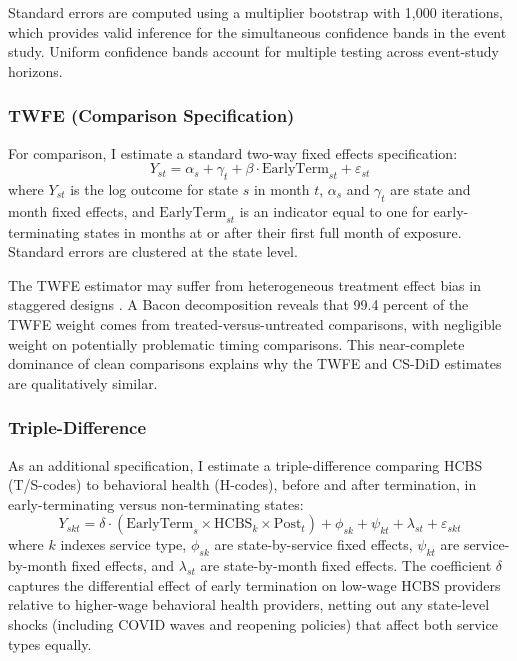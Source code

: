 \documentclass[12pt]{article}
\begin{document}
Standard errors are computed using a multiplier bootstrap with 1,000 iterations, which provides valid inference for the simultaneous confidence bands in the event study. Uniform confidence bands account for multiple testing across event-study horizons.

\subsubsection{TWFE (Comparison Specification)}

For comparison, I estimate a standard two-way fixed effects specification:
\begin{equation}
Y_{st} = \alpha_s + \gamma_t + \beta \cdot \text{EarlyTerm}_{st} + \varepsilon_{st}
\end{equation}
where $Y_{st}$ is the log outcome for state $s$ in month $t$, $\alpha_s$ and $\gamma_t$ are state and month fixed effects, and $\text{EarlyTerm}_{st}$ is an indicator equal to one for early-terminating states in months at or after their first full month of exposure. Standard errors are clustered at the state level.

The TWFE estimator may suffer from heterogeneous treatment effect bias in staggered designs \citep{goodman-bacon2021, dechaisemartin2020, sun2021}. A Bacon decomposition reveals that 99.4 percent of the TWFE weight comes from treated-versus-untreated comparisons, with negligible weight on potentially problematic timing comparisons. This near-complete dominance of clean comparisons explains why the TWFE and CS-DiD estimates are qualitatively similar.

\subsubsection{Triple-Difference}

As an additional specification, I estimate a triple-difference comparing HCBS (T/S-codes) to behavioral health (H-codes), before and after termination, in early-terminating versus non-terminating states:
\begin{equation}
Y_{skt} = \delta \cdot (\text{EarlyTerm}_s \times \text{HCBS}_k \times \text{Post}_t) + \phi_{sk} + \psi_{kt} + \lambda_{st} + \varepsilon_{skt}
\end{equation}
where $k$ indexes service type, $\phi_{sk}$ are state-by-service fixed effects, $\psi_{kt}$ are service-by-month fixed effects, and $\lambda_{st}$ are state-by-month fixed effects. The coefficient $\delta$ captures the differential effect of early termination on low-wage HCBS providers relative to higher-wage behavioral health providers, netting out any state-level shocks (including COVID waves and reopening policies) that affect both service types equally.
\end{document}
